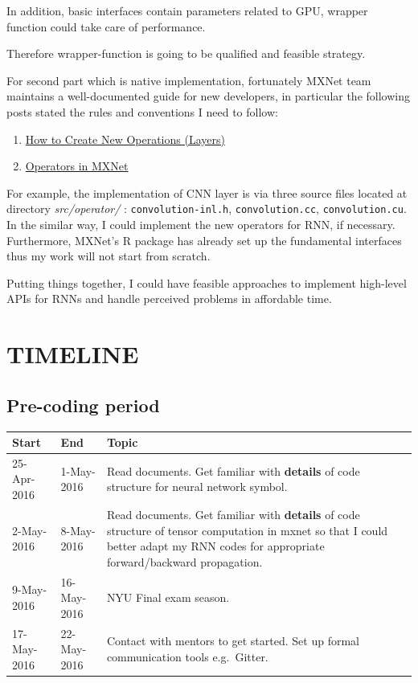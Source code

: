 \documentclass[]{article}
\providecommand{\tightlist}{%
  \setlength{\itemsep}{0pt}\setlength{\parskip}{0pt}}
\begin{document}
In addition, basic interfaces contain parameters related to GPU, wrapper
function could take care of performance.

Therefore wrapper-function is going to be qualified and feasible
strategy.

For second part which is native implementation, fortunately MXNet team
maintains a well-documented guide for new developers, in particular the
following posts stated the rules and conventions I need to follow:

\begin{enumerate}
\def\labelenumi{\arabic{enumi}.}
\tightlist
\item
  \href{http://mxnet.readthedocs.org/en/latest/tutorial/new_op_howto.html}{How
  to Create New Operations (Layers)}
\item
  \href{https://mxnet.readthedocs.org/en/latest/developer-guide/operator.html}{Operators
  in MXNet}
\end{enumerate}

For example, the implementation of CNN layer is via three source files
located at directory \emph{src/operator/} : \texttt{convolution-inl.h},
\texttt{convolution.cc}, \texttt{convolution.cu}. In the similar way, I
could implement the new operators for RNN, if necessary. Furthermore,
MXNet's R package has already set up the fundamental interfaces thus my
work will not start from scratch.

Putting things together, I could have feasible approaches to implement
high-level APIs for RNNs and handle perceived problems in affordable
time.

\section{TIMELINE}\label{timeline}

\subsection{Pre-coding period}\label{pre-coding-period}

\begin{longtable}[c]{@{}lll@{}}
\toprule
Start & End & Topic\tabularnewline
\midrule
\endhead
25-Apr-2016 & 1-May-2016 & Read documents. Get familiar with
\textbf{details} of code structure for neural network
symbol.\tabularnewline
2-May-2016 & 8-May-2016 & Read documents. Get familiar with
\textbf{details} of code structure of tensor computation in mxnet so
that I could better adapt my RNN codes for appropriate forward/backward
propagation.\tabularnewline
9-May-2016 & 16-May-2016 & NYU Final exam season.\tabularnewline
17-May-2016 & 22-May-2016 & Contact with mentors to get started. Set up
formal communication tools e.g.~Gitter.\tabularnewline
\bottomrule
\end{longtable}
\end{document}
